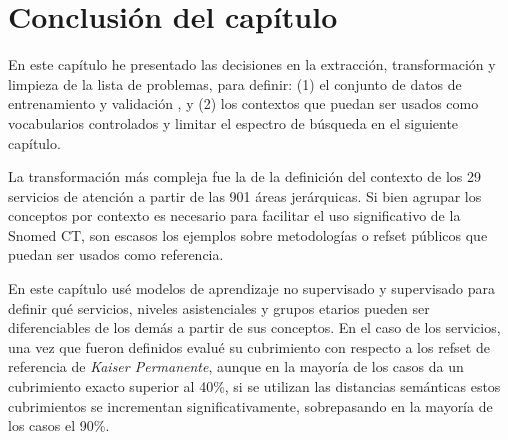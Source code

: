 \begin{table}
 \caption{Comparación de la cobertura de las especialidades del HIBA vs Nova Scotia }
  \label{coverage_scotia}
\end{table}

\section{Conclusión del capítulo}
En este capítulo he presentado las decisiones en la extracción, transformación y limpieza de la lista de problemas, para definir: (1) el conjunto de datos de entrenamiento y validación , y (2) los contextos que puedan ser usados como vocabularios controlados y limitar el espectro de búsqueda en el siguiente capítulo.

La transformación más compleja fue la de la definición del contexto de los 29 servicios de atención a partir de las 901 áreas jerárquicas. Si bien agrupar los conceptos por contexto es necesario para facilitar el uso significativo de la Snomed CT, son escasos los ejemplos sobre metodologías o  {\acrshort{refset}} públicos que puedan ser usados como referencia.

En este capítulo usé modelos de aprendizaje no supervisado y supervisado para definir qué servicios, niveles asistenciales y grupos etarios pueden ser diferenciables de los demás a partir de sus conceptos. En el caso de los servicios, una vez que fueron definidos evalué su cubrimiento con respecto a los  {\acrshort{refset}} de referencia de \textit{Kaiser Permanente}, aunque en la mayoría de los casos da un cubrimiento exacto superior al 40\%, si se utilizan las distancias semánticas estos cubrimientos se incrementan significativamente, sobrepasando en la mayoría de los casos el 90\%.
